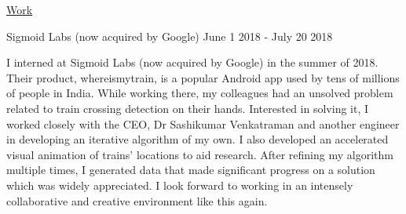 \documentclass{resume} %
\begin{document}
\begin{rSection}{\href{ https://www.nitvishn.net/\#/research }{Work}}


\begin{rSubsection}{ Sigmoid Labs (now acquired by Google) }{ June 1 2018 - July 20 2018 }{}
\item I interned at Sigmoid Labs (now acquired by Google) in the summer of 2018. Their product, whereismytrain, is a popular Android app used by tens of millions of people in India. While working there, my colleagues had an unsolved problem related to train crossing detection on their hands. Interested in solving it, I worked closely with the CEO, Dr Sashikumar Venkatraman and another engineer in developing an iterative algorithm of my own. I also developed an accelerated visual animation of trains’ locations to aid research. After refining my algorithm multiple times, I generated data that made significant progress on a solution which was widely appreciated. I look forward to working in an intensely collaborative and creative environment like this again.

\end{rSubsection}


\end{rSection}
\end{document}
